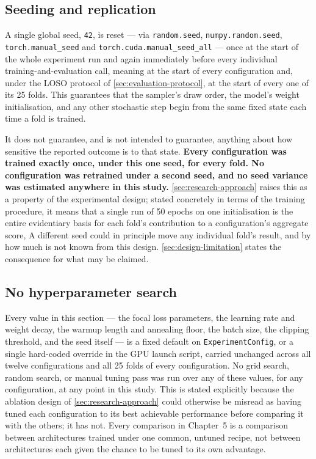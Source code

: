 \subsection{Seeding and replication}
\label{sec:seeding}

A single global seed, \texttt{42}, is reset --- via \texttt{random.seed}, \texttt{numpy.random.seed}, \texttt{torch.manual\_seed} and \texttt{torch.cuda.manual\_seed\_all} --- once at the start of the whole experiment run and again immediately before every individual training-and-evaluation call, meaning at the start of every configuration and, under the LOSO protocol of \autoref{sec:evaluation-protocol}, at the start of every one of its 25 folds. This guarantees that the sampler's draw order, the model's weight initialisation, and any other stochastic step begin from the same fixed state each time a fold is trained.

It does not guarantee, and is not intended to guarantee, anything about how sensitive the reported outcome is to that state. \textbf{Every configuration was trained exactly once, under this one seed, for every fold. No configuration was retrained under a second seed, and no seed variance was estimated anywhere in this study.} \autoref{sec:research-approach} raises this as a property of the experimental design; stated concretely in terms of the training procedure, it means that a single run of 50 epochs on one initialisation is the entire evidentiary basis for each fold's contribution to a configuration's aggregate score, A different seed could in principle move any individual fold's result, and by how much is not known from this design. \autoref{sec:design-limitation} states the consequence for what may be claimed.

\subsection{No hyperparameter search}
\label{sec:no-hyperparameter-search}

Every value in this section --- the focal loss parameters, the learning rate and weight decay, the warmup length and annealing floor, the batch size, the clipping threshold, and the seed itself --- is a fixed default on \texttt{ExperimentConfig}, or a single hard-coded override in the GPU launch script, carried unchanged across all twelve configurations and all 25 folds of every configuration. No grid search, random search, or manual tuning pass was run over any of these values, for any configuration, at any point in this study. This is stated explicitly because the ablation design of \autoref{sec:research-approach} could otherwise be misread as having tuned each configuration to its best achievable performance before comparing it with the others; it has not. Every comparison in Chapter~5 is a comparison between architectures trained under one common, untuned recipe, not between architectures each given the chance to be tuned to its own advantage.


